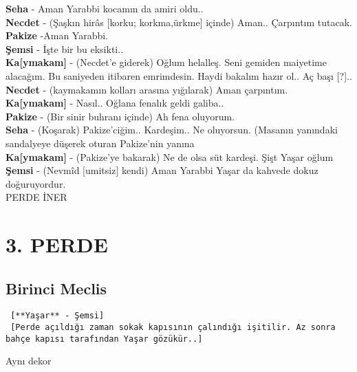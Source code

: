 \documentclass[]{book}
\begin{document}
\textbf{Seha} - Aman Yarabbi kocamın da amiri oldu..\\
\textbf{Necdet} - (Şaşkın hirâs {[}korku; korkma,ürkme{]} içinde) Aman.. Çarpıntım tutacak.\\
\textbf{Pakize} -Aman Yarabbi.\\
\textbf{Şemsi} - İşte bir bu eksikti..\\
\textbf{Ka{[}ymakam{]}} - (Necdet'e giderek) Oğlum helalleş. Seni gemiden maiyetime alacağım. Bu saniyeden itibaren emrimdesin. Haydi bakalım hazır ol.. Aç başı {[}?{]}..\\
\textbf{Necdet} - (kaymakamın kolları arasına yığılarak) Aman çarpıntım.\\
\textbf{Ka{[}ymakam{]}} - Nasıl.. Oğlana fenalık geldi galiba..\\
\textbf{Pakize} - (Bir sinir buhranı içinde) Ah fena oluyorum.\\
\textbf{Seha} - (Koşarak) Pakize'ciğim.. Kardeşim.. Ne oluyorsun. (Masanın yanındaki sandalyeye düşerek oturan Pakize'nin yanına\\
\textbf{Ka{[}ymakam{]}} - (Pakize'ye bakarak) Ne de olsa süt kardeşi. Şişt Yaşar oğlum\\
\textbf{Şemsi} - (Nevmîd {[}umitsiz{]} kendi) Aman Yarabbi Yaşar da kahvede dokuz doğuruyordur.\\

PERDE İNER

\hypertarget{perde-2}{%
\chapter{3. PERDE}\label{perde-2}}

\hypertarget{birinci-meclis-2}{%
\section{Birinci Meclis}\label{birinci-meclis-2}}

\begin{verbatim}
 [**Yaşar** - Şemsi]
 [Perde açıldığı zaman sokak kapısının çalındığı işitilir. Az sonra bahçe kapısı tarafından Yaşar gözükür..]
\end{verbatim}

Aynı dekor
\end{document}
